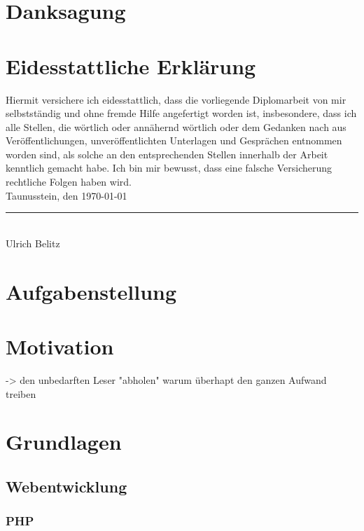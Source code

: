 \documentclass[12pt,a4paper,titlepage]{article} %
\begin{document}
\clearpage
\newpage

\section*{Danksagung}

\newpage

\section*{Eidesstattliche Erklärung}
Hiermit versichere ich eidesstattlich, dass die vorliegende Diplomarbeit von mir selbstständig und ohne fremde Hilfe angefertigt worden ist, insbesondere, dass ich alle Stellen, die wörtlich oder annähernd wörtlich oder dem Gedanken nach aus Veröffentlichungen, unveröffentlichten Unterlagen und Gesprächen entnommen worden sind, als solche an den entsprechenden Stellen innerhalb der Arbeit kenntlich gemacht habe. Ich bin mir bewusst, dass eine falsche Versicherung rechtliche Folgen haben wird.\\[10mm]
Taunusstein, den \today \\[15mm]
\noindent\rule[1pt]{0.40\textwidth}{1pt}\\
Ulrich Belitz
\newpage

\tableofcontents
\newpage

\listoffigures
\newpage

\listoftables
\newpage


\section{Aufgabenstellung} %

\section{Motivation}
-> den unbedarften Leser "abholen"
warum überhapt den ganzen Aufwand treiben

\section{Grundlagen}
\subsection{Webentwicklung}
\subsubsection{PHP}
\end{document}
